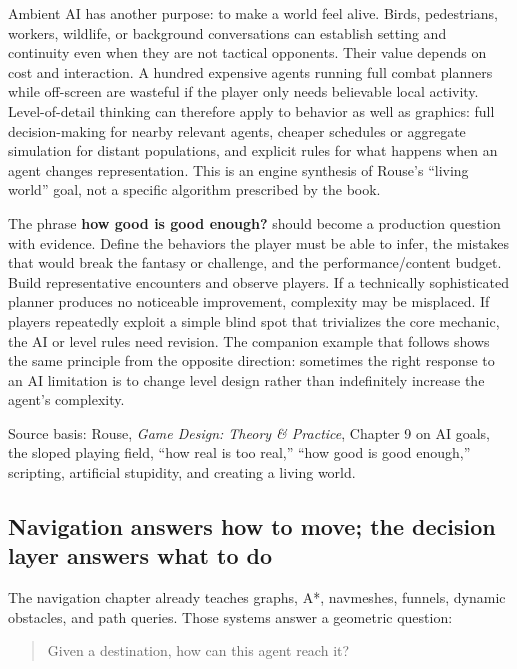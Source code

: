 Ambient AI has another purpose: to make a world feel alive. Birds, pedestrians, workers, wildlife, or background conversations can establish setting and continuity even when they are not tactical opponents. Their value depends on cost and interaction. A hundred expensive agents running full combat planners while off-screen are wasteful if the player only needs believable local activity. Level-of-detail thinking can therefore apply to behavior as well as graphics: full decision-making for nearby relevant agents, cheaper schedules or aggregate simulation for distant populations, and explicit rules for what happens when an agent changes representation. This is an engine synthesis of Rouse's ``living world'' goal, not a specific algorithm prescribed by the book.

The phrase \textbf{how good is good enough?} should become a production question with evidence. Define the behaviors the player must be able to infer, the mistakes that would break the fantasy or challenge, and the performance/content budget. Build representative encounters and observe players. If a technically sophisticated planner produces no noticeable improvement, complexity may be misplaced. If players repeatedly exploit a simple blind spot that trivializes the core mechanic, the AI or level rules need revision. The companion example that follows shows the same principle from the opposite direction: sometimes the right response to an AI limitation is to change level design rather than indefinitely increase the agent's complexity.

Source basis: Rouse, \emph{Game Design: Theory \& Practice}, Chapter 9 on AI goals, the sloped playing field, ``how real is too real,'' ``how good is good enough,'' scripting, artificial stupidity, and creating a living world.

\subsection{Navigation answers how to move; the decision layer answers what to do}\label{navigation-answers-how-to-move-the-decision-layer-answers-what-to-do}

The navigation chapter already teaches graphs, A*, navmeshes, funnels, dynamic obstacles, and path queries. Those systems answer a geometric question:

\begin{quote}
Given a destination, how can this agent reach it?
\end{quote}

